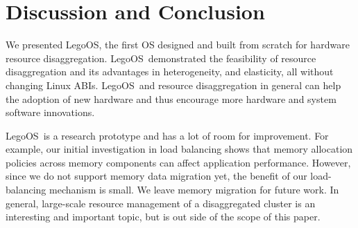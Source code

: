 \documentclass[10pt,times,twocolumn]{z2-article}
\newcommand{\lego}{LegoOS}
\providecommand{\DIFdelend}{} %
\DeclareRobustCommand{\DIFdelend}{\DIFOaddend \let\includegraphics\DIFOincludegraphics} %
\begin{document}
{{{{{{{%

\DIFdelend \section{Discussion and Conclusion}
\label{sec:conclude}

We presented \lego, the first OS designed and built from scratch for hardware resource disaggregation.
\lego\ demonstrated the feasibility of resource disaggregation and its advantages in 
heterogeneity, and elasticity, all without changing Linux ABIs.
\lego\ and resource disaggregation in general can help the adoption of new hardware
and thus encourage more hardware and system software innovations.  

\lego\ is a research prototype and has a lot of room for improvement.
For example, our initial investigation in load balancing 
shows that memory allocation policies across memory components can affect application performance.
However, since we do not support memory data migration yet, 
the benefit of our load-balancing mechanism is small.
We leave memory migration for future work.
In general, large-scale resource management of a disaggregated cluster is 
an interesting and important topic, but is out side of the scope of this paper.

}}}}}}}
\end{document}
